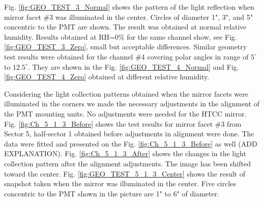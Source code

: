 Fig. \ref{fig:GEO_TEST_3_Normal} shows the pattern of the light reflection when mirror facet \#3 was illuminated in the center. Circles of diameter 1", 3", and 5" concentric to the PMT are shown. The result was obtained at normal relative humidity. Results obtained at RH=0\% for the same channel show, see Fig. \ref{fig:GEO_TEST_3_Zero}, small but acceptable differences. Similar geometry test results were obtained for the channel \#4 covering polar angles in range of $5^\circ$ to $12.5^\circ$. They are shown in the Fig. \ref{fig:GEO_TEST_4_Normal} and  Fig. \ref{fig:GEO_TEST_4_Zero} obtained at different relative humidity.

Considering the light collection patterns obtained when the mirror facets were illuminated in the corners we made the necessary adjustments in the alignment of the PMT mounting units. No adjustments were needed for the HTCC mirror. Fig. \ref{fig:Ch_5_1_3_Before} shows the test results for mirror facet \#3 from Sector 5, half-sector 1 obtained before adjustments in alignment were done. The data were fitted and presented on the Fig. \ref{fig:Ch_5_1_3_Before} as well (ADD EXPLANATION). Fig. \ref{fig:Ch_5_1_3_After} shows the changes in the light collection pattern after the alignment adjustments. The image has been shifted toward the center. Fig. \ref{fig:GEO_TEST_5_1_3_Center} shows the result of snapshot taken when the mirror was illuminated in the center. Five circles concentric to the PMT shown in the picture are 1" to 6" of diameter. 

